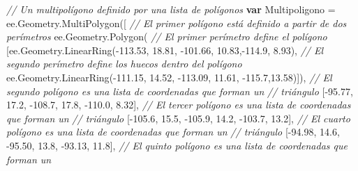 \documentclass[
  12pt,
  letterpaper,
  twoside]{book}
\newenvironment{Shaded}{\begin{snugshade}}{\end{snugshade}}
\newcommand{\AttributeTok}[1]{\textcolor[rgb]{0.48,0.12,0.64}{#1}}
\newcommand{\CommentTok}[1]{\textcolor[rgb]{0.24,0.58,0.00}{\textit{#1}}}
\newcommand{\ControlFlowTok}[1]{\textcolor[rgb]{0.00,0.00,0.00}{\textbf{#1}}}
\newcommand{\FloatTok}[1]{\textcolor[rgb]{0.28,0.53,0.93}{#1}}
\newcommand{\FunctionTok}[1]{\textcolor[rgb]{0.48,0.12,0.64}{#1}}
\newcommand{\KeywordTok}[1]{\textcolor[rgb]{0.48,0.12,0.64}{#1}}
\newcommand{\NormalTok}[1]{#1}
\newcommand{\OperatorTok}[1]{\textcolor[rgb]{0.00,0.00,0.00}{#1}}
\begin{document}
\begin{Shaded}
\begin{Highlighting}[]
\CommentTok{// Un multipolígono definido por una lista de polígonos}
\ControlFlowTok{var}\NormalTok{ Multipoligono }\OperatorTok{=} \KeywordTok{ee}\OperatorTok{.}\AttributeTok{Geometry}\OperatorTok{.}\FunctionTok{MultiPolygon}\NormalTok{([}
    \CommentTok{// El primer polígono está definido a partir de dos perímetros}
    \KeywordTok{ee}\OperatorTok{.}\AttributeTok{Geometry}\OperatorTok{.}\FunctionTok{Polygon}\NormalTok{(  }
    \CommentTok{// El primer perímetro define el polígono                }
\NormalTok{      [}\KeywordTok{ee}\OperatorTok{.}\AttributeTok{Geometry}\OperatorTok{.}\FunctionTok{LinearRing}\NormalTok{(}\OperatorTok{{-}}\FloatTok{113.53}\OperatorTok{,} \FloatTok{18.81}\OperatorTok{,} \OperatorTok{{-}}\FloatTok{101.66}\OperatorTok{,} \FloatTok{10.83}\OperatorTok{,{-}}\FloatTok{114.9}\OperatorTok{,} \FloatTok{8.93}\NormalTok{)}\OperatorTok{,}    
      \CommentTok{// El segundo perímetro define los huecos dentro del polígono}
    \KeywordTok{ee}\OperatorTok{.}\AttributeTok{Geometry}\OperatorTok{.}\FunctionTok{LinearRing}\NormalTok{(}\OperatorTok{{-}}\FloatTok{111.15}\OperatorTok{,} \FloatTok{14.52}\OperatorTok{,} \OperatorTok{{-}}\FloatTok{113.09}\OperatorTok{,} \FloatTok{11.61}\OperatorTok{,} \OperatorTok{{-}}\FloatTok{115.7}\OperatorTok{,}\FloatTok{13.58}\NormalTok{)])}\OperatorTok{,}
    \CommentTok{// El segundo polígono es una lista de coordenadas que forman un }
    \CommentTok{// triángulo}
\NormalTok{    [}\OperatorTok{{-}}\FloatTok{95.77}\OperatorTok{,} \FloatTok{17.2}\OperatorTok{,}
     \OperatorTok{{-}}\FloatTok{108.7}\OperatorTok{,} \FloatTok{17.8}\OperatorTok{,}
     \OperatorTok{{-}}\FloatTok{110.0}\OperatorTok{,} \FloatTok{8.32}\NormalTok{]}\OperatorTok{,}
    \CommentTok{// El tercer polígono es una lista de coordenadas que forman un }
    \CommentTok{// triángulo}
\NormalTok{    [}\OperatorTok{{-}}\FloatTok{105.6}\OperatorTok{,} \FloatTok{15.5}\OperatorTok{,}                
     \OperatorTok{{-}}\FloatTok{105.9}\OperatorTok{,} \FloatTok{14.2}\OperatorTok{,}
     \OperatorTok{{-}}\FloatTok{103.7}\OperatorTok{,} \FloatTok{13.2}\NormalTok{]}\OperatorTok{,}
    \CommentTok{// El cuarto polígono es una lista de coordenadas que forman un }
    \CommentTok{// triángulo}
\NormalTok{    [}\OperatorTok{{-}}\FloatTok{94.98}\OperatorTok{,} \FloatTok{14.6}\OperatorTok{,}         
     \OperatorTok{{-}}\FloatTok{95.50}\OperatorTok{,} \FloatTok{13.8}\OperatorTok{,}
     \OperatorTok{{-}}\FloatTok{93.13}\OperatorTok{,} \FloatTok{11.8}\NormalTok{]}\OperatorTok{,}
    \CommentTok{// El quinto polígono es una lista de coordenadas que forman un }

\end{Highlighting}
\end{Shaded}
\end{document}
